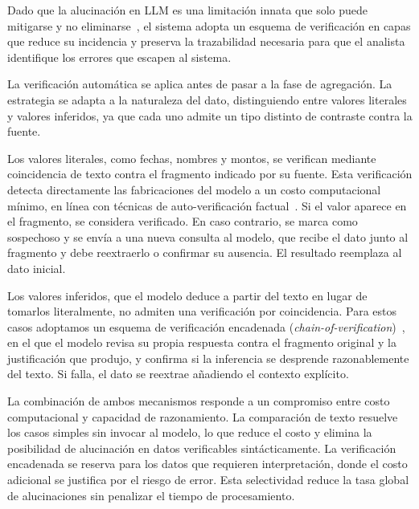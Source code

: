 Dado que la alucinación en \acs{LLM} es una limitación innata que 
solo puede mitigarse y no eliminarse~\cite{xu2024hallucination}, 
el sistema adopta un esquema de verificación en capas que 
reduce su incidencia y preserva la trazabilidad necesaria para 
que el analista identifique los errores que escapen al sistema.

La verificación automática se aplica antes de pasar a la fase 
de agregación. La estrategia se adapta a la naturaleza del 
dato, distinguiendo entre valores literales y valores 
inferidos, ya que cada uno admite un tipo distinto de 
contraste contra la fuente.


Los valores literales, como fechas, nombres y montos, se 
verifican mediante coincidencia de texto contra el fragmento 
indicado por su fuente. Esta verificación detecta directamente 
las fabricaciones del modelo a un costo computacional mínimo, 
en línea con técnicas de auto-verificación 
factual~\cite{manakul2023selfcheckgpt}. Si el valor aparece 
en el fragmento, se considera verificado. En caso contrario, 
se marca como sospechoso y se envía a una nueva consulta al 
modelo, que recibe el dato junto al fragmento y debe 
reextraerlo o confirmar su ausencia. El resultado reemplaza 
al dato inicial.

Los valores inferidos, que el modelo deduce a partir del 
texto en lugar de tomarlos literalmente, no admiten una 
verificación por coincidencia. Para estos casos adoptamos un 
esquema de verificación encadenada 
(\textit{chain-of-verification})~\cite{dhuliawala2024chainofverification}, 
en el que el modelo revisa su propia respuesta contra el 
fragmento original y la justificación que produjo, y confirma 
si la inferencia se desprende razonablemente del texto. Si 
falla, el dato se reextrae añadiendo el contexto explícito.

La combinación de ambos mecanismos responde a un compromiso 
entre costo computacional y capacidad de razonamiento. La 
comparación de texto resuelve los casos simples sin invocar 
al modelo, lo que reduce el costo y elimina la posibilidad 
de alucinación en datos verificables sintácticamente. La 
verificación encadenada se reserva para los datos que 
requieren interpretación, donde el costo adicional se 
justifica por el riesgo de error. Esta selectividad reduce 
la tasa global de alucinaciones sin penalizar el tiempo de 
procesamiento.

